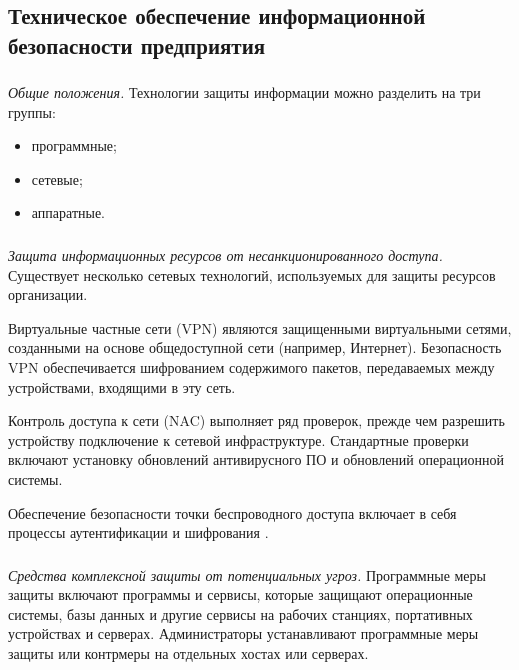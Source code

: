 \subsection{Техническое обеспечение информационной безопасности предприятия}
\label{subsec:measures:technical}

\subsubsection{}
\label{subsubsec:measures:techical:general}

\textit{Общие положения.}
Технологии защиты информации можно разделить на три группы:
\begin{itemize}
	\item программные;
	\item сетевые;
	\item аппаратные.
\end{itemize}

\subsubsection{}
\label{subsubsec:measures:techical:protection}

\textit{Защита информационных ресурсов от несанкционированного доступа.} Существует несколько сетевых технологий, используемых для защиты ресурсов организации.

Виртуальные частные сети (VPN) являются защищенными виртуальными сетями, созданными на основе общедоступной сети (например, Интернет). Безопасность VPN обеспечивается шифрованием содержимого пакетов, передаваемых между устройствами, входящими в эту сеть.

Контроль доступа к сети (NAC) выполняет ряд проверок, прежде чем разрешить устройству подключение к сетевой инфраструктуре. Стандартные проверки включают установку обновлений антивирусного ПО и обновлений операционной системы.

Обеспечение безопасности точки беспроводного доступа включает в себя процессы аутентификации и шифрования \cite{cisco_network_security}.

\subsubsection{}
\label{subsubsec:measures:techical:comprehensive}

\textit{Средства комплексной защиты от потенциальных угроз.} Программные меры защиты включают программы и сервисы, которые защищают операционные системы, базы данных и другие сервисы на рабочих станциях, портативных устройствах и серверах.
Администраторы устанавливают программные меры защиты или контрмеры на отдельных хостах или серверах.

